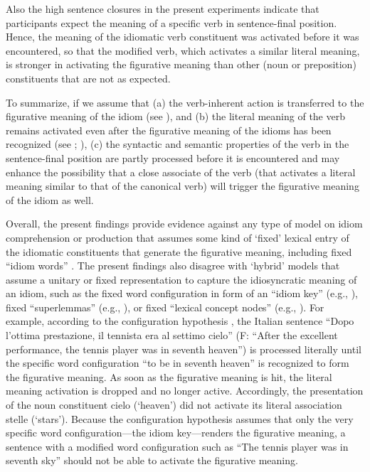 \documentclass[output=paper]{langsci/langscibook}
\begin{document}
Also the high sentence closures in the present experiments indicate that participants expect the meaning of a specific verb in sentence-final position. Hence, the meaning of the idiomatic verb constituent was activated before it was encountered, so that the modified verb, which activates a similar literal meaning, is stronger in activating the figurative meaning than other (noun or preposition) constituents that are not as expected. 


To summarize, if we assume that (a) the verb-inherent action is transferred to the figurative meaning of the idiom (see \citet{hamblin:1999}), and (b) the literal meaning of the verb remains activated even after the figurative meaning of the idioms has been recognized (see \citet{rabanus:2008}; \citet{smolka:2007}), (c) the syntactic and semantic properties of the verb in the sentence-final position are partly processed before it is encountered and may enhance the possibility that a close associate of the verb (that activates a literal meaning similar to that of the canonical verb) will trigger the figurative meaning of the idiom as well.  


Overall, the present findings provide evidence against any type of model on idiom comprehension or production that assumes some kind of ‘fixed’ lexical entry of the idiomatic constituents that generate the figurative meaning, including fixed “idiom words” \citep{bobrow:1973}. The present findings also disagree with ‘hybrid’ models that assume a unitary or fixed representation to capture the idiosyncratic meaning of an idiom, such as the fixed word configuration in form of an “idiom key” (e.g., \citet{cacciari:1988}), fixed “superlemmas” (e.g., \citet{sprenger:2006}), or fixed “lexical concept nodes” (e.g., \citet{cutting:1997}). For example, according to the configuration hypothesis \citep{cacciari:1988}, the Italian sentence “Dopo l’ottima prestazione, il tennista era al settimo cielo” (F: “After the excellent performance, the tennis player was in seventh heaven”) is processed literally until the specific word configuration “to be in seventh heaven” is recognized to form the figurative meaning. As soon as the figurative meaning is hit, the literal meaning activation is dropped and no longer active. Accordingly, the presentation of the noun constituent cielo (‘heaven’) did not activate its literal association stelle (‘stars’). Because the configuration hypothesis assumes that only the very specific word configuration—the idiom key—renders the figurative meaning, a sentence with a modified word configuration such as “The tennis player was in seventh sky” should not be able to activate the figurative meaning. 
\end{document}
